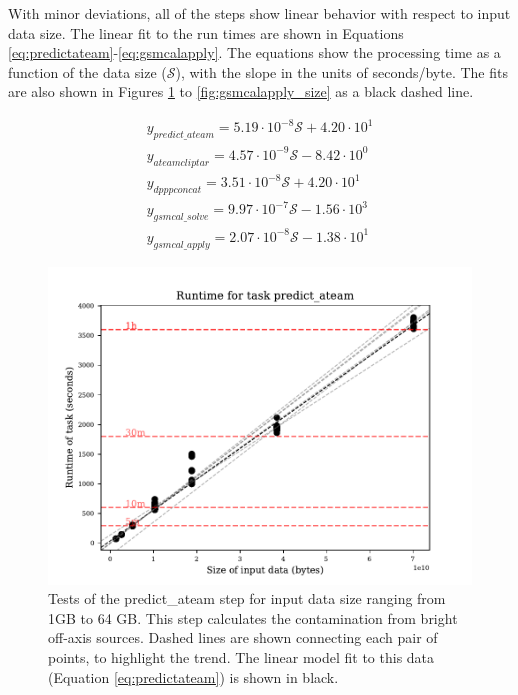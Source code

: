 \documentclass[preprint,5p]{elsarticle}
\begin{document}
With minor deviations, all of the steps show linear behavior with respect to input data size. The linear fit to the run times are shown in Equations \ref{eq:predictateam}-\ref{eq:gsmcalapply}. The equations show the processing time as a function of the data size ($\mathcal{S}$), with the slope in the units of seconds/byte. The fits are also shown in Figures \ref{fig:predict_ateam} to \ref{fig:gsmcalapply_size} as a black dashed line.

\begin{subequations}
\begin{align}
        y_{predict\_ateam}=5.19\cdot10^{-8}\mathcal{S}+4.20\cdot10^1 \label{eq:predictateam} \\
        y_{ateamcliptar}=4.57\cdot10^{-9}\mathcal{S}-8.42\cdot10^0 \label{eq:ateamcliptar} \\
        y_{dpppconcat}=3.51\cdot10^{-8}\mathcal{S}+4.20\cdot10^1 \label{eq:dpppconcat} \\
        y_{gsmcal\_solve}=9.97\cdot10^{-7}\mathcal{S}-1.56\cdot10^3 \label{eq:gsmcalsolve} \\
        y_{gsmcal\_apply}=2.07\cdot10^{-8}\mathcal{S}-1.38\cdot10^1 \label{eq:gsmcalapply}
\end{align}
\label{eq:runtime_size_models}
\end{subequations}


\begin{figure}
    \includegraphics[width=0.95\linewidth]{figures/predict_ateam_size.pdf}
      \caption{Tests of the predict\_ateam step for input data size ranging from 1GB to 64 GB. This step calculates the contamination from bright off-axis sources. Dashed lines are shown connecting each pair of points, to highlight the trend. The linear model fit to this data (Equation \ref{eq:predictateam}) is shown in black. }
	\label{fig:predict_ateam}
\end{figure}
\end{document}
